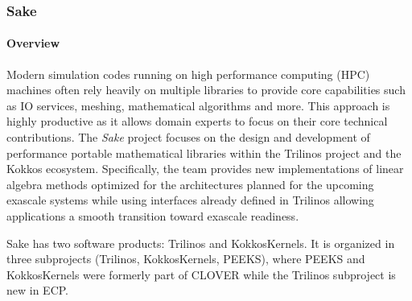\subsubsection{ Sake} \label{subsubsect:sake}

\paragraph{Overview} 

Modern simulation codes running on high performance computing (HPC) machines often rely heavily on multiple libraries to provide core capabilities such as 
IO services, meshing, mathematical algorithms and more. This approach is highly productive as it allows domain experts to focus on their core technical 
contributions. The \emph{Sake} project focuses on the design and development of performance portable mathematical libraries within the Trilinos project and the 
Kokkos ecosystem. Specifically, the team provides new implementations of linear algebra methods optimized for the architectures planned for the upcoming exascale 
systems while using interfaces already defined in Trilinos allowing applications a smooth transition toward exascale readiness.

Sake has two software products: Trilinos and KokkosKernels. It is organized in three subprojects (Trilinos, KokkosKernels, PEEKS), where 
PEEKS and KokkosKernels were formerly part of CLOVER while the Trilinos subproject is new in ECP.
